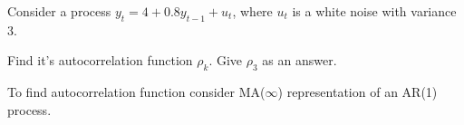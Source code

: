 
\begin{question}
Consider a process \(y_t = 4 + 0.8 y_{t-1} + u_t\), where \(u_t\) is a white noise with variance 3.

Find it's autocorrelation function \(\rho_k\). Give \(\rho_3\) as an answer.
\end{question}

\begin{solution}
To find autocorrelation function consider MA(\(\infty\)) representation of an AR(1) process.
\end{solution}

